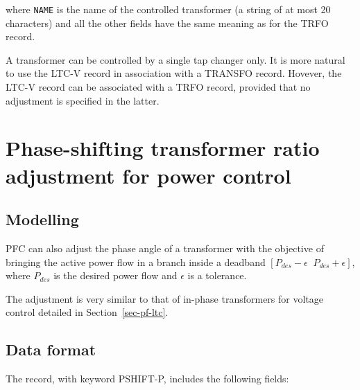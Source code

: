 where {\tt NAME} is the name of the controlled transformer (a string of at most 20 characters) and all the other fields have the same meaning as for the TRFO record.

A transformer can be controlled by a single tap changer only. It is more natural to use the LTC-V record in association with a TRANSFO record. Hovever, the LTC-V record can be associated with a TRFO record, provided that no adjustment is specified in the latter. 



\section{Phase-shifting transformer ratio adjustment for power control}

\subsection{Modelling}

PFC can also adjust the phase angle of a transformer with the objective of bringing the active power flow in a branch inside a deadband $[P_{des}-\epsilon \;\; P_{des}+\epsilon]$, where $P_{des}$ is the desired power flow and $\epsilon$ is a tolerance.

The adjustment is very similar to that of in-phase transformers for voltage control detailed in  Section~\ref{sec-pf-ltc}.

\subsection{Data format}

The record, with keyword PSHIFT-P, includes the following fields:

\hspace*{5ex}{\tt PSHIFT-P CONTRFO MONBRANCH PHAFIRST PHALAST NBPOS SIGN PDES TOLP ;}

